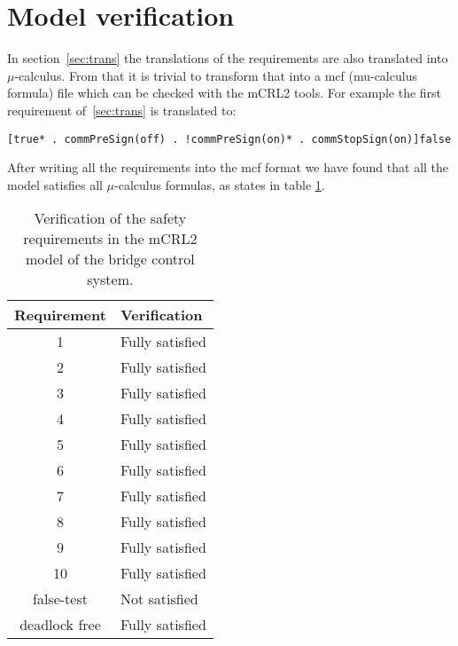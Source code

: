\section{Model verification}
\label{sec:check}

In section~\ref{sec:trans} the translations of the requirements are also
translated into $\mu$-calculus. From that it is trivial to transform that into
a mcf (mu-calculus formula) file which can be checked with the mCRL2 tools. For example the first
requirement of~\ref{sec:trans} is translated to:

\begin{verbatim}
[true* . commPreSign(off) . !commPreSign(on)* . commStopSign(on)]false
\end{verbatim}

After writing all the requirements into the mcf format we have found that all
the model satisfies all $\mu$-calculus formulas, as states in table \ref{tab:checks}.
%
\begin{table}[htb]%
\centering
\begin{tabular}{|c|l|}
	\hline
	\textbf{Requirement} & \textbf{Verification}\\
	\hline
	1 & Fully satisfied\\
	2 & Fully satisfied\\
	3 & Fully satisfied\\
	4 & Fully satisfied\\
	5 & Fully satisfied\\
	6 & Fully satisfied\\
	7 & Fully satisfied\\
	8 & Fully satisfied\\
	9 & Fully satisfied\\
	10 & Fully satisfied\\
	\hline
	false-test & Not satisfied\\
	deadlock free & Fully satisfied\\
	\hline
\end{tabular}
\caption{Verification of the safety requirements in the mCRL2 model of the bridge control system.}
\label{tab:checks}
\end{table}

\newpage